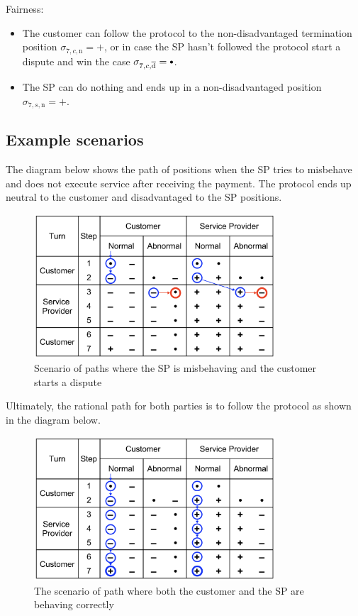 \documentclass{ieeeaccess}
\newcommand\sbullet[1][.75]{\mathbin{\ThisStyle{\vcenter{\hbox{%
  \scalebox{#1}{$\SavedStyle\bullet$}}}}}%
}
\begin{document}
Fairness:

\begin{itemize}

\item
  The customer can follow the protocol to the non-disadvantaged termination position \(\sigma_{7, c, \mathrm{n}} = +\), or in case the SP hasn't followed the protocol start a dispute and win the case \(\sigma_{7, c, \overline{\mathrm{d}}} = \sbullet\).
\item
  The SP can do nothing and ends up in a non-disadvantaged position \(\sigma_{7, s, \mathrm{n}} = +\).
\end{itemize}

\subsection{Example scenarios}\label{example-scenarios}

The diagram below shows the path of positions when the SP tries to misbehave and does not execute service after receiving the payment. The protocol ends up neutral to the customer and disadvantaged to the SP positions.

\begin{figure}[h!]
\includegraphics[width=9cm]{formal-misbehaviour-path.png}
\centering
\caption{Scenario of paths where the SP is misbehaving and the customer starts a dispute}
\label{fig:misbehaviour}
\end{figure}

Ultimately, the rational path for both parties is to follow the protocol as shown in the diagram below.

\begin{figure}[h!]
\includegraphics[width=9cm]{formal-rational-path.png}
\centering
\caption{The scenario of path where both the customer and  the SP are behaving correctly}
\label{fig:well-behaviour}
\end{figure}
\end{document}
